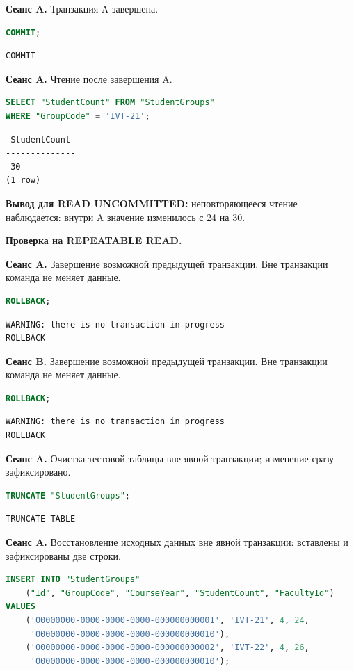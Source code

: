 \documentclass[12pt,a4paper]{article}
\begin{document}
\textbf{Сеанс A.} Транзакция A завершена.
\begin{lstlisting}[language=SQL]
COMMIT;
\end{lstlisting}

\begin{lstlisting}
COMMIT
\end{lstlisting}

\textbf{Сеанс A.} Чтение после завершения A.
\begin{lstlisting}[language=SQL]
SELECT "StudentCount" FROM "StudentGroups"
WHERE "GroupCode" = 'IVT-21';
\end{lstlisting}

\begin{lstlisting}
 StudentCount
--------------
 30
(1 row)
\end{lstlisting}

\textbf{Вывод для READ UNCOMMITTED:} неповторяющееся чтение наблюдается: внутри A значение изменилось с 24 на 30.

\textbf{Проверка на REPEATABLE READ.}

\textbf{Сеанс A.} Завершение возможной предыдущей транзакции. Вне транзакции команда не меняет данные.
\begin{lstlisting}[language=SQL]
ROLLBACK;
\end{lstlisting}

\begin{lstlisting}
WARNING: there is no transaction in progress
ROLLBACK
\end{lstlisting}

\textbf{Сеанс B.} Завершение возможной предыдущей транзакции. Вне транзакции команда не меняет данные.
\begin{lstlisting}[language=SQL]
ROLLBACK;
\end{lstlisting}

\begin{lstlisting}
WARNING: there is no transaction in progress
ROLLBACK
\end{lstlisting}

\textbf{Сеанс A.} Очистка тестовой таблицы вне явной транзакции; изменение сразу зафиксировано.
\begin{lstlisting}[language=SQL]
TRUNCATE "StudentGroups";
\end{lstlisting}

\begin{lstlisting}
TRUNCATE TABLE
\end{lstlisting}

\textbf{Сеанс A.} Восстановление исходных данных вне явной транзакции: вставлены и зафиксированы две строки.
\begin{lstlisting}[language=SQL]
INSERT INTO "StudentGroups"
    ("Id", "GroupCode", "CourseYear", "StudentCount", "FacultyId")
VALUES
    ('00000000-0000-0000-0000-000000000001', 'IVT-21', 4, 24,
     '00000000-0000-0000-0000-000000000010'),
    ('00000000-0000-0000-0000-000000000002', 'IVT-22', 4, 26,
     '00000000-0000-0000-0000-000000000010');
\end{lstlisting}
\end{document}
